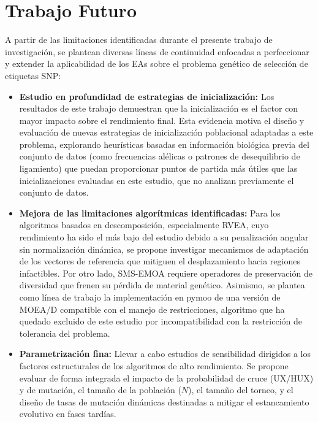\section{Trabajo Futuro}

A partir de las limitaciones identificadas durante el presente trabajo de investigación, se plantean diversas líneas de continuidad enfocadas a perfeccionar y extender la aplicabilidad de los EAs sobre el problema genético de selección de etiquetas SNP:

\begin{itemize}
    \item \textbf{Estudio en profundidad de estrategias de inicialización:} Los resultados de este trabajo demuestran que la inicialización es el factor con mayor impacto sobre el rendimiento final. Esta evidencia motiva el diseño y evaluación de nuevas estrategias de inicialización poblacional adaptadas a este problema, explorando heurísticas basadas en información biológica previa del conjunto de datos (como frecuencias alélicas o patrones de desequilibrio de ligamiento) que puedan proporcionar puntos de partida más útiles que las inicializaciones evaluadas en este estudio, que no analizan previamente el conjunto de datos.
    \item \textbf{Mejora de las limitaciones algorítmicas identificadas:} Para los algoritmos basados en descomposición, especialmente RVEA, cuyo rendimiento ha sido el más bajo del estudio debido a su penalización angular sin normalización dinámica, se propone investigar mecanismos de adaptación de los vectores de referencia que mitiguen el desplazamiento hacia regiones infactibles. Por otro lado, SMS-EMOA requiere operadores de preservación de diversidad que frenen su pérdida de material genético. Asimismo, se plantea como línea de trabajo la implementación en pymoo de una versión de MOEA/D compatible con el manejo de restricciones, algoritmo que ha quedado excluido de este estudio por incompatibilidad con la restricción de tolerancia del problema.
    \item \textbf{Parametrización fina:} Llevar a cabo estudios de sensibilidad dirigidos a los factores estructurales de los algoritmos de alto rendimiento. Se propone evaluar de forma integrada el impacto de la probabilidad de cruce (UX/HUX) y de mutación, el tamaño de la población ($N$), el tamaño del torneo, y el diseño de tasas de mutación dinámicas destinadas a mitigar el estancamiento evolutivo en fases tardías.
\end{itemize}